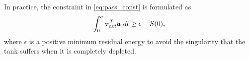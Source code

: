 In practice, the constraint in \eqref{eq:pass_const} is formulated as
\begin{equation}
    \int_{0}^{\sigma} \boldsymbol{\tau}_{ext}^T \pmb{u} \ dt \geq \epsilon - S(0),
\end{equation}
where $\epsilon$ is a positive minimum residual energy to avoid the singularity that the tank suffers when it is completely depleted.  

